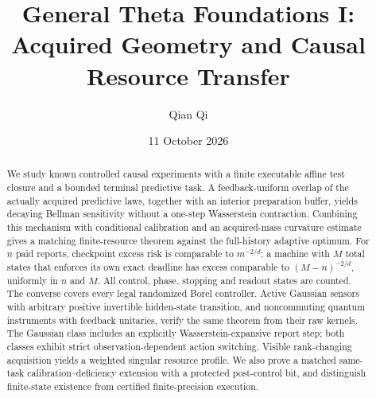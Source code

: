 \documentclass[11pt]{amsart}
\title[General Theta Foundations I]{General Theta Foundations I:\\Acquired Geometry and Causal Resource Transfer}
\author{Qian Qi}\date{11 October 2026}
\theoremstyle{definition}\newtheorem{definition}[theorem]{Definition}
\theoremstyle{remark}\newtheorem{remark}[theorem]{Remark}
\begin{document}
\raggedbottom
\begin{abstract}
We study known controlled causal experiments with a finite executable affine test closure and a bounded terminal predictive task. A feedback-uniform overlap of the actually acquired predictive laws, together with an interior preparation buffer, yields decaying Bellman sensitivity without a one-step Wasserstein contraction. Combining this mechanism with conditional calibration and an acquired-mass curvature estimate gives a matching finite-resource theorem against the full-history adaptive optimum. For $n$ paid reports, checkpoint excess risk is comparable to $m^{-2/d}$; a machine with $M$ total states that enforces its own exact deadline has excess comparable to $(M-n)^{-2/d}$, uniformly in $n$ and $M$. All control, phase, stopping and readout states are counted. The converse covers every legal randomized Borel controller. Active Gaussian sensors with arbitrary positive invertible hidden-state transition, and noncommuting quantum instruments with feedback unitaries, verify the same theorem from their raw kernels. The Gaussian class includes an explicitly Wasserstein-expansive report step; both classes exhibit strict observation-dependent action switching. Visible rank-changing acquisition yields a weighted singular resource profile. We also prove a matched same-task calibration--deficiency extension with a protected post-control bit, and distinguish finite-state existence from certified finite-precision execution.
\end{abstract}\maketitle









\appendix

\clearpage
\end{document}
